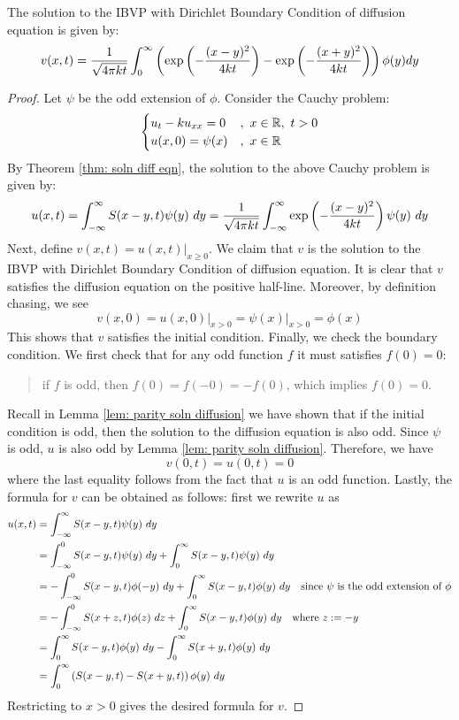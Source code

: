 \begin{lem}
    The solution to the IBVP with Dirichlet Boundary Condition of diffusion equation is given by:
    \[v(x,t) = \frac{1}{\sqrt{4\pi k t}} \int_0^\infty \left(\exp\left(-\frac{(x-y)^2}{4kt}\right) - \exp\left(-\frac{(x+y)^2}{4kt}\right)\right) \phi(y) dy\]
\end{lem}
\begin{proof}
    Let $\psi$ be the odd extension of $\phi$. Consider the Cauchy problem:
    \[\begin{cases}
        u_t - ku_{xx} = 0 &,\ x\in {\mathbb R},\ t>0\\
        u(x,0) = \psi(x) &,\ x\in {\mathbb R} 
    \end{cases}\]
    By Theorem \ref{thm: soln diff eqn}, the solution to the above Cauchy problem is given by:
    \[u(x,t) = \int_{-\infty}^{\infty} S(x-y,t)\psi(y)\ dy = \frac{1}{\sqrt{4\pi k t}} \int_{-\infty}^\infty \exp\left(-\frac{(x-y)^2}{4kt}\right) \psi(y)\ dy\]
    Next, define $v(x,t) = u(x,t)\vert_{x\geq 0}$. We claim that $v$ is the solution to the IBVP with Dirichlet Boundary Condition of diffusion equation. It is clear that $v$ satisfies the diffusion equation on the positive half-line. Moreover, by definition chasing, we see 
    \[v(x,0)=u(x,0)\vert_{x>0} = \psi(x)\vert_{x>0}=\phi(x)\]
    This shows that $v$ satisfies the initial condition. Finally, we check the boundary condition. We first check that for any odd function $f$ it must satisfies $f(0)=0$:
    \begin{quote}
        if $f$ is odd, then $f(0) = f(-0) = -f(0)$, which implies $f(0)=0$.
    \end{quote}
    Recall in Lemma \ref{lem: parity soln diffusion} we have shown that if the initial condition is odd, then the solution to the diffusion equation is also odd. Since $\psi$ is odd, $u$ is also odd by Lemma \ref{lem: parity soln diffusion}. Therefore, we have
    \[v(0,t) = u(0,t) = 0\]
    where the last equality follows from the fact that $u$ is an odd function. Lastly, the formula for $v$ can be obtained as follows: first we rewrite $u$ as
    \begin{align*}
        u(x,t) &= \int_{-\infty}^{\infty} S(x-y,t)\psi(y)\ dy\\
        &= \int_{-\infty}^0 S(x-y,t)\psi(y)\ dy + \int_0^\infty S(x-y,t)\psi(y)\ dy\\
        &= -\int_{-\infty}^0 S(x-y,t)\phi(-y)\ dy + \int_0^\infty S(x-y,t)\phi(y)\ dy \quad \text{since $\psi$ is the odd extension of $\phi$}\\
        &= -\int_{-\infty}^0 S(x+z,t)\phi(z)\ dz + \int_0^\infty S(x-y,t)\phi(y)\ dy \quad \text{where } z := -y\\
        &= \int_0^\infty S(x-y,t)\phi(y)\ dy - \int_0^\infty S(x+y,t)\phi(y)\ dy \\
        &= \int_0^\infty \left(S(x-y,t) - S(x+y,t)\right) \phi(y)\ dy
    \end{align*}
    Restricting to $x> 0$ gives the desired formula for $v$.
\end{proof}

